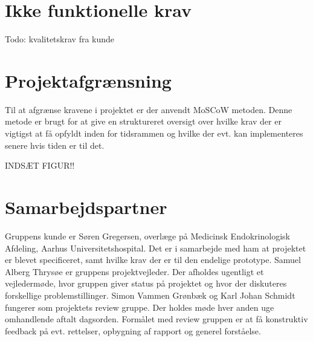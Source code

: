 \section{Ikke funktionelle krav}
Todo: kvalitetskrav fra kunde


\section{Projektafgrænsning}
Til at afgrænse kravene i projektet er der anvendt MoSCoW metoden. Denne metode er brugt for at give en struktureret oversigt over hvilke krav der er vigtigst at få opfyldt inden for tidsrammen og hvilke der evt. kan implementeres senere hvis tiden er til det.

INDSÆT FIGUR!!
\section{Samarbejdspartner}
Gruppens kunde er Søren Gregersen, overlæge på Medicinsk Endokrinologisk Afdeling, Aarhus Universitetshospital. Det er i samarbejde med ham at projektet er blevet specificeret, samt hvilke krav der er til den endelige prototype.
Samuel Alberg Thrysøe er gruppens projektvejleder. Der afholdes ugentligt et vejledermøde, hvor gruppen giver status på projektet og hvor der diskuteres forskellige problemstillinger. 
Simon Vammen Grønbæk og Karl Johan Schmidt fungerer som projektets review gruppe. Der holdes møde hver anden uge omhandlende aftalt dagsorden. Formålet med review gruppen er at få konstruktiv feedback på evt. rettelser, opbygning af rapport og generel forståelse.
